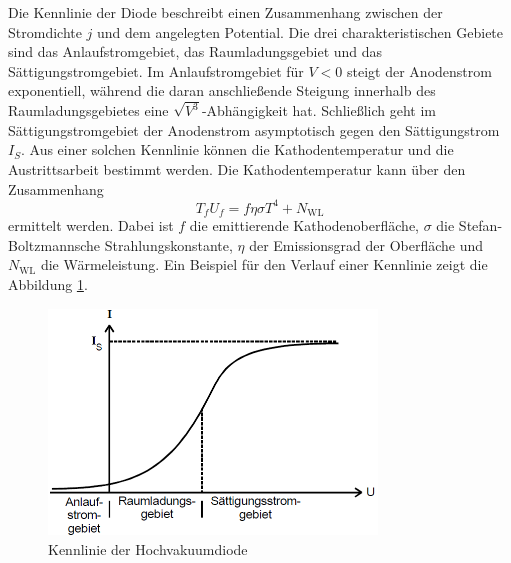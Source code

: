 Die Kennlinie der Diode beschreibt einen Zusammenhang zwischen der Stromdichte $j$ und dem angelegten Potential. Die drei charakteristischen 
Gebiete sind das Anlaufstromgebiet, das Raumladungsgebiet und das Sättigungstromgebiet. Im Anlaufstromgebiet für $V < 0$ steigt der Anodenstrom
exponentiell, während die daran anschließende Steigung innerhalb des Raumladungsgebietes eine $\sqrt{V^3}$-Abhängigkeit hat. Schließlich geht 
im Sättigungstromgebiet der Anodenstrom asymptotisch gegen den Sättigungstrom $I_S$.
Aus einer solchen Kennlinie können die Kathodentemperatur und die Austrittsarbeit bestimmt werden.
Die Kathodentemperatur kann über den Zusammenhang 
\begin{equation}
    T_f U_f = f \eta \sigma T^4 + N_\text{WL} 
\end{equation} 
ermittelt werden. Dabei ist $f$ die emittierende Kathodenoberfläche, $\sigma$ die Stefan-Boltzmannsche Strahlungskonstante, $\eta$ der 
Emissionsgrad der Oberfläche und $N_\text{WL} $ die Wärmeleistung. 
Ein Beispiel für den Verlauf einer Kennlinie zeigt die 
Abbildung \ref{fig:kennlinie}. 
\begin{figure}
    \centering
    \includegraphics[height=6cm]{data/kennlinie.png}
    \caption{Kennlinie der Hochvakuumdiode}
    \label{fig:kennlinie}
\end{figure}
\FloatBarrier

